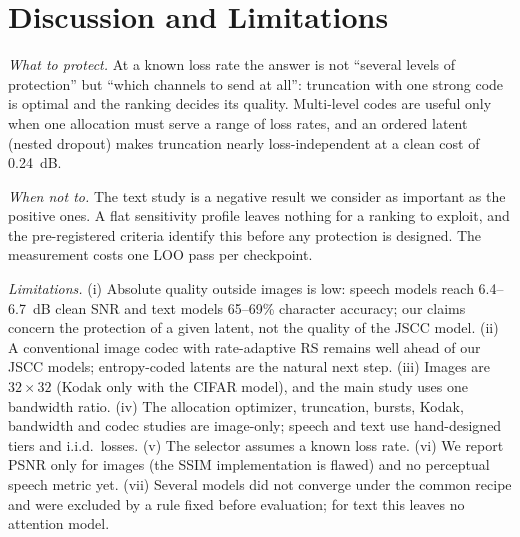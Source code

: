 \documentclass[journal]{IEEEtran}
\begin{document}
\section{Discussion and Limitations}\label{sec:discussion}
\emph{What to protect.} At a known loss rate the answer is not ``several levels of protection'' but
``which channels to send at all'': truncation with one strong code is optimal and the ranking decides its
quality. Multi-level codes are useful only when one allocation must serve a range of loss rates, and an
ordered latent (nested dropout) makes truncation nearly loss-independent at a clean cost of 0.24~dB.

\emph{When not to.} The text study is a negative result we consider as important as the positive ones.
A flat sensitivity profile leaves nothing for a ranking to exploit, and the pre-registered criteria
identify this before any protection is designed. The measurement costs one LOO pass per checkpoint.

\emph{Limitations.} (i) Absolute quality outside images is low: speech models reach 6.4--6.7~dB clean
SNR and text models 65--69\% character accuracy; our claims concern the protection of a given latent,
not the quality of the JSCC model. (ii) A conventional image codec with rate-adaptive RS remains well
ahead of our JSCC models; entropy-coded latents are the natural next step. (iii) Images are $32\times32$
(Kodak only with the CIFAR model), and the main study uses one bandwidth ratio. (iv) The allocation
optimizer, truncation, bursts, Kodak, bandwidth and codec studies are image-only; speech and text use
hand-designed tiers and i.i.d.\ losses. (v) The selector assumes a known loss rate. (vi) We report PSNR
only for images (the SSIM implementation is flawed) and no perceptual speech metric yet. (vii) Several
models did not converge under the common recipe and were excluded by a rule fixed before evaluation; for
text this leaves no attention model.

\end{document}

